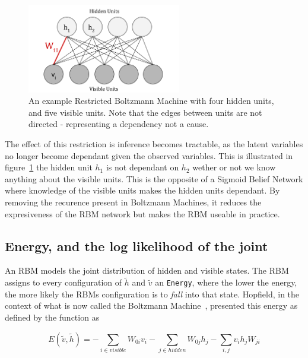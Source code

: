   \begin{figure}[h]
  \begin{center}
    \includegraphics[width = 0.6\textwidth]{Assets/RBM_Example.png}
  \caption{An example Restricted Boltzmann Machine with four hidden units, and five visible units. Note that the edges between units are not directed - representing a dependency not a cause. }
  \label{F:Restricted-Boltzmann-Machine}
  \end{center}
  \end{figure}

 The effect of this restriction is inference becomes tractable, as the latent variables no longer become dependant given the observed variables. This is illustrated in figure~\ref{F:Restricted-Boltzmann-Machine} the hidden unit $h_1$ is not dependant on $h_2$ wether or not we know anything about the visible units. This is the opposite of a Sigmoid Belief Network where knowledge of the visible units makes the hidden units dependant. By removing the recurence present in Boltzmann Machines, it reduces the expresiveness of the RBM network but makes the RBM useable in practice. 


  \subsection{Energy, and the log likelihood of the joint}

  An RBM models the joint distribution of hidden and visible states.
  The RBM assigns to every configuration of $\tilde{h}$ and $\tilde{v}$ an \texttt{Energy}, where the lower the energy, the more likely the RBMs configuration is to \textit{fall} into that state. Hopfield, in the context of what is now called the Boltzmann Machine~\cite{Hopfield01041982}, presented this energy as defined by the function as

  $$ E(\tilde{v},\tilde{h}) = -\sum_{i \in visible}{W_{0i}v_i}   -\sum_{j \in hidden}{W_{0j}h_j}  -\sum_{i,j}{v_ih_jW_{ji}}  $$

